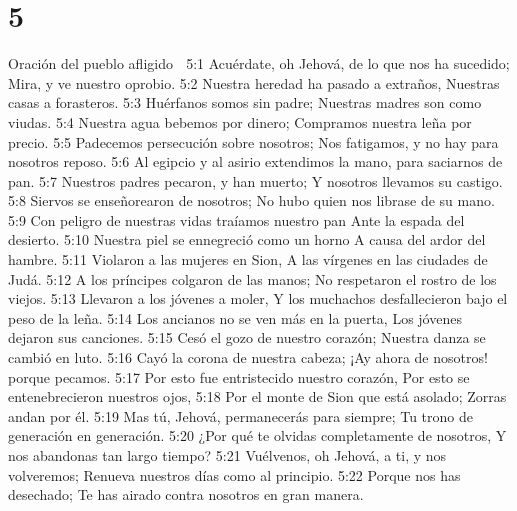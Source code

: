 \chapter{5}

Oración del pueblo afligido  

5:1 Acuérdate, oh Jehová, de lo que nos ha sucedido;  
Mira, y ve nuestro oprobio.  
5:2 Nuestra heredad ha pasado a extraños,  
Nuestras casas a forasteros.  
5:3 Huérfanos somos sin padre;  
Nuestras madres son como viudas.  
5:4 Nuestra agua bebemos por dinero;  
Compramos nuestra leña por precio.  
5:5 Padecemos persecución sobre nosotros;  
Nos fatigamos, y no hay para nosotros reposo.  
5:6 Al egipcio y al asirio extendimos la mano, para saciarnos de pan.  
5:7 Nuestros padres pecaron, y han muerto;  
Y nosotros llevamos su castigo.  
5:8 Siervos se enseñorearon de nosotros;  
No hubo quien nos librase de su mano.  
5:9 Con peligro de nuestras vidas traíamos nuestro pan  
Ante la espada del desierto.  
5:10 Nuestra piel se ennegreció como un horno  
A causa del ardor del hambre.  
5:11 Violaron a las mujeres en Sion,  
A las vírgenes en las ciudades de Judá.  
5:12 A los príncipes colgaron de las manos;  
No respetaron el rostro de los viejos.  
5:13 Llevaron a los jóvenes a moler,  
Y los muchachos desfallecieron bajo el peso de la leña.  
5:14 Los ancianos no se ven más en la puerta,  
Los jóvenes dejaron sus canciones.  
5:15 Cesó el gozo de nuestro corazón;  
Nuestra danza se cambió en luto.  
5:16 Cayó la corona de nuestra cabeza;  
¡Ay ahora de nosotros! porque pecamos.  
5:17 Por esto fue entristecido nuestro corazón,  
Por esto se entenebrecieron nuestros ojos,  
5:18 Por el monte de Sion que está asolado;  
Zorras andan por él.  
5:19 Mas tú, Jehová, permanecerás para siempre;  
Tu trono de generación en generación.  
5:20 ¿Por qué te olvidas completamente de nosotros,  
Y nos abandonas tan largo tiempo?  
5:21 Vuélvenos, oh Jehová, a ti, y nos volveremos;  
Renueva nuestros días como al principio.  
5:22 Porque nos has desechado;  
Te has airado contra nosotros en gran manera.

